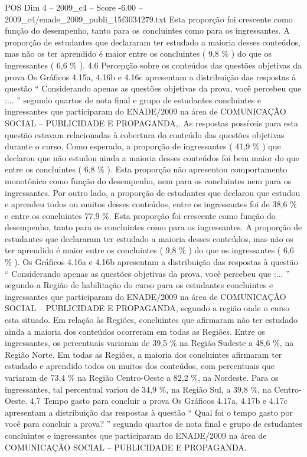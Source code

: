 \begin{textsample}{POS Dim 4 – 2009\_c4 – Score -6.00 – 2009\_c4/enade\_2009\_publi\_15f3034279.txt}
Esta proporção foi crescente como função do desempenho, tanto para os concluintes como para os ingressantes.
A proporção de estudantes que declararam ter estudado a maioria desses conteúdos, mas não os ter aprendido é maior entre os concluintes ( 9,8 \% ) do que os ingressantes ( 6,6 \% ). 4.6 Percepção sobre os conteúdos das questões objetivas da prova Os Gráficos 4.15a, 4.16b e 4.16c apresentam a distribuição das respostas à questão “ Considerando apenas as questões objetivas da prova, você percebeu que :... ” segundo quartos de nota final e grupo de estudantes concluintes e ingressantes que participaram do ENADE/2009 na área de COMUNICAÇÃO SOCIAL – PUBLICIDADE E PROPAGANDA,.
As respostas possíveis para esta questão estavam relacionadas à cobertura do conteúdo das questões objetivas durante o curso.
Como esperado, a proporção de ingressantes ( 41,9 \% ) que declarou que não estudou ainda a maioria desses conteúdos foi bem maior do que entre os concluintes ( 6,8 \% ).
Esta proporção não apresentou comportamento monotônico como função do desempenho, nem para os concluintes nem para os ingressantes.
Por outro lado, a proporção de estudantes que declarou que estudou e aprendeu todos ou muitos desses conteúdos, entre os ingressantes foi de 38,6 \% e entre os concluintes 77,9 \%.
Esta proporção foi crescente como função do desempenho, tanto para os concluintes como para os ingressantes.
A proporção de estudantes que declararam ter estudado a maioria desses conteúdos, mas não os ter aprendido é maior entre os concluintes ( 9,8 \% ) do que os ingressantes ( 6,6 \% ).
Os Gráficos 4.16a e 4.16b apresentam a distribuição das respostas à questão “ Considerando apenas as questões objetivas da prova, você percebeu que :... ” segundo a Região de habilitação do curso para os estudantes concluintes e ingressantes que participaram do ENADE/2009 na área de COMUNICAÇÃO SOCIAL – PUBLICIDADE E PROPAGANDA, segundo a região onde o curso esta situado.
Em relação às Regiões, concluintes que afirmaram não ter estudado ainda a maioria dos conteúdos ocorreram em todas as Regiões.
Entre os ingressantes, os percentuais variaram de 39,5 \% na Região Sudeste a 48,6 \%, na Região Norte.
Em todas as Regiões, a maioria dos concluintes afirmaram ter estudado e aprendido todos ou muitos dos conteúdos, com percentuais que variaram de 73,4 \% na Região Centro-Oeste a 82,2 \%, na Nordeste.
Para os ingressantes, tal percentual variou de 34,9 \%, na Região Sul, a 39,8 \%, na Centro-Oeste. 4.7 Tempo gasto para concluir a prova Os Gráficos 4.17a, 4.17b e 4.17c apresentam a distribuição das respostas à questão “ Qual foi o tempo gasto por você para concluir a prova? ” segundo quartos de nota final e grupo de estudantes concluintes e ingressantes que participaram do ENADE/2009 na área de COMUNICAÇÃO SOCIAL – PUBLICIDADE E PROPAGANDA.

\end{textsample}
